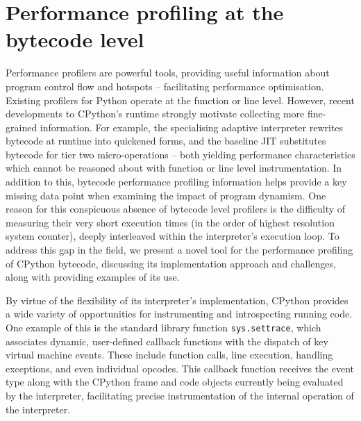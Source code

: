 \chapter{Performance profiling at the bytecode level} %
\label{chap:profiling-bytecode}

Performance profilers are powerful tools, providing useful information about program control flow and hotspots -- facilitating performance optimisation.
Existing profilers for Python operate at the function or line level.
However, recent developments to CPython's runtime strongly motivate collecting more fine-grained information. For example, the specialising adaptive interpreter rewrites bytecode at runtime into quickened forms, and the baseline JIT substitutes bytecode for tier two micro-operations -- both yielding performance characteristics which cannot be reasoned about with function or line level instrumentation.
In addition to this, bytecode performance profiling information helps provide a key missing data point when examining the impact of program dynamism.
One reason for this conspicuous absence of bytecode level profilers is the difficulty of measuring their very short execution times (in the order of highest resolution system counter), deeply interleaved within the interpreter's execution loop.
To address this gap in the field, we present a novel tool for the performance profiling of CPython bytecode, discussing its implementation approach and challenges, along with providing examples of its use.




By virtue of the flexibility of its interpreter's implementation, CPython provides a wide variety of opportunities for instrumenting and introspecting running code.
One example of this is the standard library function \texttt{sys.settrace}, which associates dynamic, user-defined callback functions with the dispatch of key virtual machine events. These include function calls, line execution, handling exceptions, and even individual opcodes.
This callback function receives the event type along with the CPython frame and code objects currently being evaluated by the interpreter, facilitating precise instrumentation of the internal operation of the interpreter.

